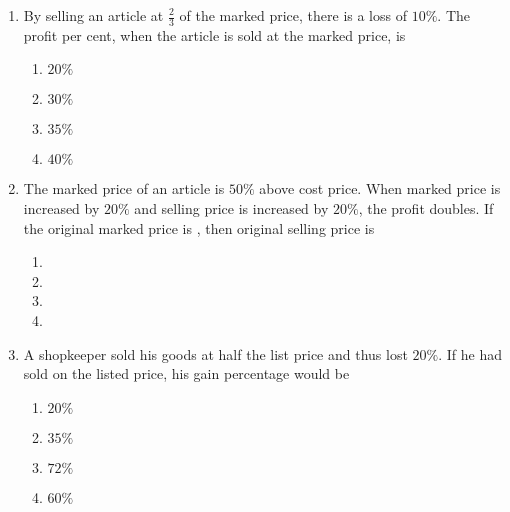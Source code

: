\documentclass[twocolumn]{article}
\begin{document}
\begin{enumerate}
        \item By selling an article at $\frac{2}{3}$ of the marked price, there is a loss of $10 \%$. The profit per cent, when the article is sold at the marked price, is
            \begin{enumerate}
                \item $20 \%$
                \item $30 \%$
                \item $35 \%$
                \item $40 \%$
            \end{enumerate}
            
        \item The marked price of an article is $50 \%$ above cost price. When marked price is increased by $20 \%$ and selling price is increased by $20 \%$, the profit doubles. If the original marked price is , then original selling price is
            \begin{enumerate}
                \item {}
                \item {}
                \item {}
                \item {}
            \end{enumerate}
            
        \item A shopkeeper sold his goods at half the list price and thus lost $20 \%$. If he had sold on the listed price, his gain percentage would be
            \begin{enumerate}
                \item $20 \%$
                \item $35 \%$
                \item $72 \%$
                \item $60 \%$
            \end{enumerate}
\end{enumerate}
\end{document}
